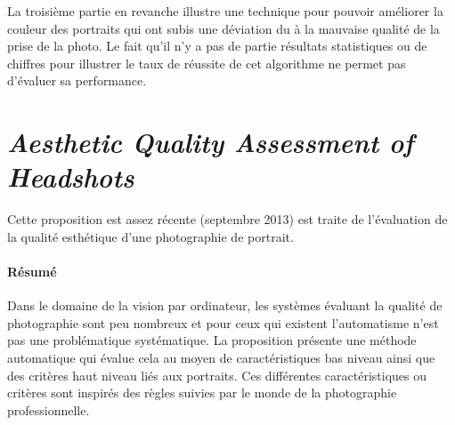 \documentclass[11pt, french]{report-rd-info}
\begin{document}
La troisième partie en revanche illustre une technique pour pouvoir améliorer la couleur des portraits qui ont subis une déviation du à la mauvaise qualité de la prise de la photo.
Le fait qu'il n'y a pas de partie résultats statistiques ou de chiffres pour illustrer le taux de réussite de cet algorithme ne permet pas d'évaluer sa performance.


\section{\emph{Aesthetic Quality Assessment of Headshots}}
Cette proposition \cite{Males2013} est assez récente (septembre 2013) est traite de l’évaluation de la qualité esthétique d’une photographie de portrait.

\paragraph{Résumé}
Dans le domaine de la vision par ordinateur, les systèmes évaluant la qualité de photographie sont peu nombreux et pour ceux qui existent l’automatisme n’est pas une problématique systématique. La proposition présente une méthode automatique qui évalue cela au moyen de caractéristiques bas niveau ainsi que des critères haut niveau liés aux portraits. Ces différentes caractéristiques ou critères sont inspirés des règles suivies par le monde de la photographie professionnelle.
\end{document}
